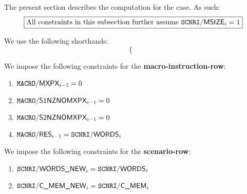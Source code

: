 

The present section describes the computation for the  case. As such:
\[
	\boxed{\text{All constraints in this subsection further assume } \texttt{SCNRI}\textsf{/}{\textsf{MSIZE}}_{i} = 1}
\]

We use the following shorthands: %
\[
	\left\{ \begin{array}{lclr}
	\end{array} \right.
\]

We impose the following constraints for the \textbf{macro-instruction-row}:

\begin{enumerate}
	\item $\texttt{MACRO}\textsf{/}{\textsf{MXPX}}_{i-1} = 0$
    \item $\texttt{MACRO}\textsf{/}{\textsf{S1NZNOMXPX}}_{i-1} = 0$
    \item $\texttt{MACRO}\textsf{/}{\textsf{S2NZNOMXPX}}_{i-1} = 0$
    \item $\texttt{MACRO}\textsf{/}{\textsf{RES}}_{i-1} = \texttt{SCNRI}\textsf{/}{\textsf{WORDS}}_{i}$
\end{enumerate}

We impose the following constraints for the \textbf{scenario-row}:

\begin{enumerate}
	\item $\texttt{SCNRI}\textsf{/}{\textsf{WORDS\_NEW}}_{i} = \texttt{SCNRI}\textsf{/}{\textsf{WORDS}}_{i}$
	\item $\texttt{SCNRI}\textsf{/}{\textsf{C\_MEM\_NEW}}_{i}  =  \texttt{SCNRI}\textsf{/}{\textsf{C\_MEM}}_{i}$
\end{enumerate}


